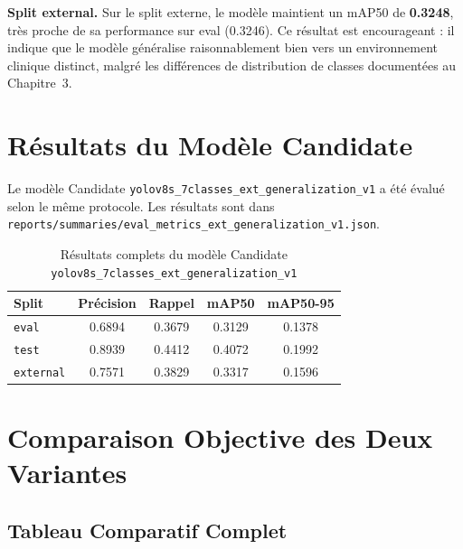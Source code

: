 \documentclass{rapportENSIAS}
\newcommand{\projectpath}[1]{\texttt{#1}}
\begin{document}
\textbf{Split external.} Sur le split externe, le modèle maintient
un mAP50 de \textbf{0.3248}, très proche de sa performance sur eval
(0.3246). Ce résultat est encourageant : il indique que le modèle
généralise raisonnablement bien vers un environnement clinique distinct,
malgré les différences de distribution de classes documentées au
Chapitre~3.

\section{Résultats du Modèle Candidate}

Le modèle Candidate \texttt{yolov8s\_7classes\_ext\_generalization\_v1}
a été évalué selon le même protocole. Les résultats sont dans
\projectpath{reports/summaries/eval\_metrics\_ext\_generalization\_v1.json}.

\begin{table}[H]
\centering
\caption{Résultats complets du modèle Candidate
         \texttt{yolov8s\_7classes\_ext\_generalization\_v1}}
\label{tab:results_candidate}
\begin{tabular}{lcccc}
\toprule
\textbf{Split} & \textbf{Précision} & \textbf{Rappel}
               & \textbf{mAP50} & \textbf{mAP50-95} \\
\midrule
\texttt{eval}     & 0.6894 & 0.3679 & 0.3129 & 0.1378 \\
\texttt{test}     & 0.8939 & 0.4412 & 0.4072 & 0.1992 \\
\texttt{external} & 0.7571 & 0.3829 & 0.3317 & 0.1596 \\
\bottomrule
\end{tabular}
\end{table}

\section{Comparaison Objective des Deux Variantes}

\subsection{Tableau Comparatif Complet}
\end{document}
